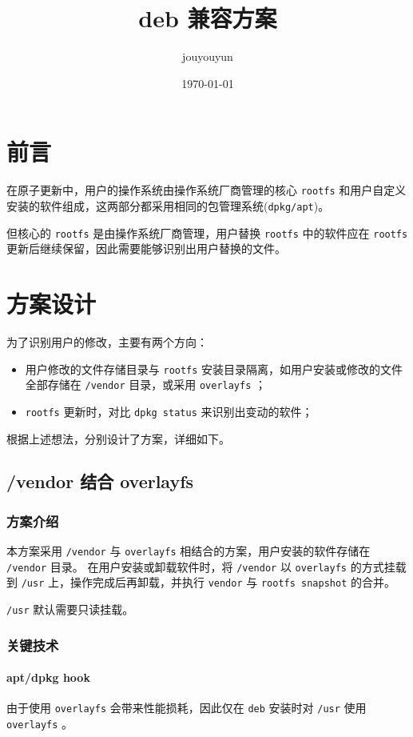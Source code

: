 \documentclass{utart}
\author{jouyouyun}
\date{\today}
\title{deb 兼容方案}
\begin{document}
\utMakeTOC

\section{前言}
在原子更新中，用户的操作系统由操作系统厂商管理的核心 \texttt{rootfs} 和用户自定义安装的软件组成，这两部分都采用相同的包管理系统(\texttt{dpkg/apt})。

但核心的 \texttt{rootfs} 是由操作系统厂商管理，用户替换 \texttt{rootfs} 中的软件应在 \texttt{rootfs} 更新后继续保留，因此需要能够识别出用户替换的文件。

\section{方案设计}
为了识别用户的修改，主要有两个方向：
\begin{itemize}[leftmargin=4em]
\item 用户修改的文件存储目录与 \texttt{rootfs} 安装目录隔离，如用户安装或修改的文件全部存储在 \texttt{/vendor} 目录，或采用 \texttt{overlayfs} ；
\item \texttt{rootfs} 更新时，对比 \texttt{dpkg status} 来识别出变动的软件；
\end{itemize}

根据上述想法，分别设计了方案，详细如下。

\subsection{/vendor 结合 overlayfs}
\subsubsection{方案介绍}
本方案采用 \texttt{/vendor} 与 \texttt{overlayfs} 相结合的方案，用户安装的软件存储在  \texttt{/vendor} 目录。
在用户安装或卸载软件时，将 \texttt{/vendor} 以 \texttt{overlayfs} 的方式挂载到 \texttt{/usr} 上，操作完成后再卸载，并执行 \texttt{vendor} 与 \texttt{rootfs snapshot} 的合并。

\texttt{/usr} 默认需要只读挂载。

\subsubsection{关键技术}
\paragraph{apt/dpkg hook}
由于使用 \texttt{overlayfs} 会带来性能损耗，因此仅在 \texttt{deb} 安装时对 \texttt{/usr} 使用 \texttt{overlayfs} 。
\end{document}
